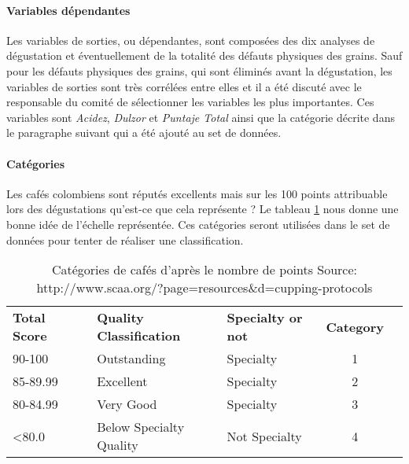 \paragraph{Variables dépendantes\label{VarDep}} Les variables de sorties, ou dépendantes, sont composées des dix analyses de dégustation et éventuellement de la totalité des défauts physiques des grains. Sauf pour les défauts physiques des grains, qui sont éliminés avant la dégustation, les variables de sorties sont très corrélées entre elles et il a été discuté avec le responsable du comité  de sélectionner les variables les plus importantes. Ces variables sont \textit{Acidez}, \textit{Dulzor} et \textit{Puntaje Total} ainsi que la catégorie décrite dans le paragraphe suivant qui a été ajouté au set de données.  

\paragraph{Catégories}
Les cafés colombiens sont réputés excellents mais sur les 100 points attribuable lors des dégustations qu'est-ce que cela représente ? Le tableau \ref{categoriesCafe} nous donne une bonne idée de l'échelle représentée. Ces catégories seront utilisées dans le set de données pour tenter de réaliser une classification. 
\begin{table}[H]
	\centering
	\caption{Catégories de cafés d'après le nombre de points \newline Source: http://www.scaa.org/?page=resources\&d=cupping-protocols \label{categoriesCafe}}
	\begin{tabular}{llllcl}
		\textbf{Total Score}   &  & \textbf{Quality Classification}   & \textbf{Specialty or not}  & \textbf{Category} \\
		
		90-100        &  & Outstanding              & Specialty         &  1                    \\
		85-89.99      &  & Excellent                & Specialty         &  2                    \\
		80-84.99      &  & Very Good                & Specialty         &  3                    \\
		\textless80.0 &  & Below Specialty Quality & Not Specialty     &  4                   
	\end{tabular}
\end{table}









